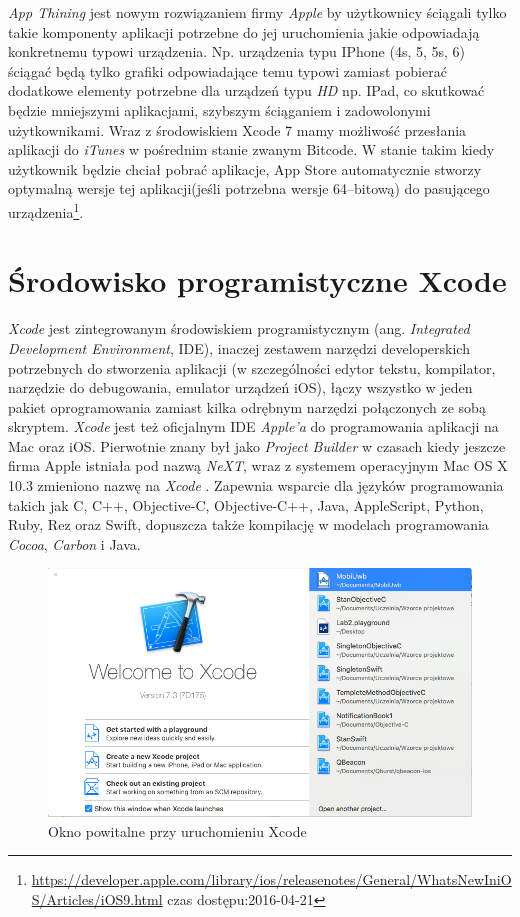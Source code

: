 \documentclass{iiuwb}
\begin{document}
\textit{App Thining} jest nowym rozwiązaniem firmy \textit{Apple} by użytkownicy ściągali tylko takie komponenty aplikacji potrzebne do jej uruchomienia jakie odpowiadają konkretnemu typowi urządzenia. Np. urządzenia typu IPhone (4s, 5, 5s, 6) ściągać będą tylko grafiki odpowiadające temu typowi zamiast pobierać dodatkowe elementy potrzebne dla urządzeń typu \textit{HD} np. IPad, co skutkować będzie mniejszymi aplikacjami, szybszym ściąganiem i zadowolonymi użytkownikami. Wraz z środowiskiem Xcode 7 mamy możliwość przesłania aplikacji do \textit{iTunes} w pośrednim stanie zwanym Bitcode. W stanie takim kiedy użytkownik będzie chciał pobrać aplikacje, App Store automatycznie stworzy optymalną wersje tej aplikacji(jeśli potrzebna wersje 64--bitową) do pasującego urządzenia\footnote{\url{https://developer.apple.com/library/ios/releasenotes/General/WhatsNewIniOS/Articles/iOS9.html} czas dostępu:2016-04-21}. 


\section{Środowisko programistyczne Xcode}
\textit{Xcode} jest zintegrowanym środowiskiem programistycznym (ang. \textit{Integrated Development Environment}, IDE), inaczej zestawem narzędzi developerskich potrzebnych do stworzenia aplikacji (w szczególności edytor tekstu, kompilator, narzędzie do debugowania, emulator urządzeń iOS), łączy wszystko w jeden pakiet oprogramowania zamiast kilka odrębnym narzędzi połączonych ze sobą skryptem. \textit{Xcode} jest też oficjalnym IDE \textit{Apple'a} do programowania aplikacji na Mac oraz iOS. Pierwotnie znany był jako \textit{Project Builder} w czasach kiedy jeszcze firma Apple istniała pod nazwą \textit{NeXT}, wraz z systemem operacyjnym Mac OS X 10.3 zmieniono nazwę na \textit{Xcode} . Zapewnia wsparcie dla języków programowania takich jak C, C++, Objective-C, Objective-C++, Java, AppleScript, Python, Ruby, Rez oraz Swift, dopuszcza także kompilację w modelach programowania \textit{Cocoa}, \textit{Carbon} i Java.
\begin{figure}[!th]
\centering
\includegraphics[scale=.5]{image/XcodeOknoPowitalne.png}
\caption{Okno powitalne przy uruchomieniu Xcode}
\label{fig:XcodeOknoPowitalne}
\end{figure}
\end{document}
